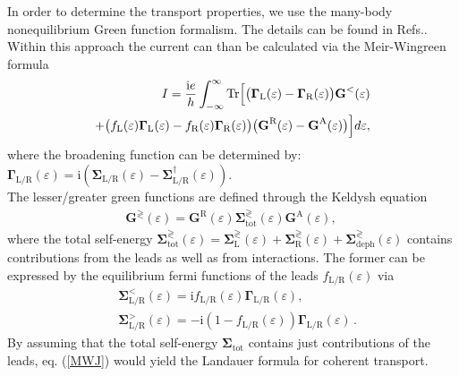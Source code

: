\documentclass[reprint,superscriptaddress,nofootinbib,amsmath,amssymb,prb,floatfix]{revtex4-1}
\begin{document}
In order to determine the transport properties, we use the many-body nonequilibrium Green function
formalism. The details can be found in Refs.\cite{Ryndyk09inbook,Ryndyk2015}. Within this approach
the current can than be calculated via the Meir-Wingreen formula
\begin{align}\label{MWJ}  \notag
    I = \frac{\mathrm{i}e}{h} \int^\infty_{-\infty} \text{Tr}\Big[\big(\boldsymbol{\Gamma}_\text{L}(\varepsilon)-\boldsymbol{\Gamma}_\text{R}(\varepsilon)\big)\textbf{G}^\text{<}(\varepsilon)\\ 
    +\big(f_\text{L}{(\varepsilon)}{\boldsymbol{\Gamma}_\text{L}(\varepsilon)} - f_\text{R}{(\varepsilon)}{\boldsymbol{\Gamma}_\text{R}(\varepsilon)}\big) %
    \big(\textbf{G}^\text{R}(\varepsilon) - \textbf{G}^\text{A}(\varepsilon)\big)\Big]
     d\varepsilon,
\end{align}
where the broadening function can be determined by:
$\boldsymbol{\Gamma}_\text{L/R}(\varepsilon) = \text{i} (\boldsymbol{\Sigma}_\text{L/R}(\varepsilon) - \boldsymbol{\Sigma}_\text{L/R}^\dagger(\varepsilon))$. \\
The lesser/greater green functions are defined through the Keldysh equation
\begin{align}  
    \textbf{G}^\gtrless(\varepsilon) = \textbf{G}^\text{R}(\varepsilon)\boldsymbol{\Sigma}^\gtrless_\text{tot}(\varepsilon)
    \textbf{G}^\text{A}(\varepsilon),\
\end{align}
%
where the total self-energy
$\boldsymbol{\Sigma}^\gtrless_\text{tot}(\varepsilon) =
\boldsymbol{\Sigma}^\gtrless_{\text{L}}(\varepsilon) +
\boldsymbol{\Sigma}^\gtrless_{\text{R}}(\varepsilon) +
\boldsymbol{\Sigma}^\gtrless_{\text{deph}}(\varepsilon)$ contains contributions from the leads as
well as from interactions. The former can be expressed by the equilibrium fermi functions of the
leads $f_\text{L/R}(\varepsilon)$ via
\begin{align}
  &\boldsymbol{\Sigma}^\text{<}_\text{L/R}(\varepsilon) = \text{i} f_\text{L/R}(\varepsilon)\boldsymbol{\Gamma}_\text{L/R}(\varepsilon), \\ 
  &\boldsymbol{\Sigma}^\text{>}_\text{L/R}(\varepsilon) = -\text{i}\left(1-f_\text{L/R}(\varepsilon)\right)\boldsymbol{\Gamma}_\text{L/R}(\varepsilon) \,.
\end{align}
By assuming that the total self-energy $\boldsymbol{\Sigma}_\text{tot}$ contains just contributions
of the leads, eq. (\ref{MWJ}) would yield the Landauer formula for coherent transport.
\end{document}
